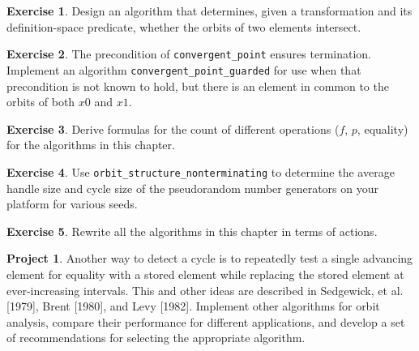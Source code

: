 \documentclass{report}
\theoremstyle{definition}
\newtheorem{exercise}{Exercise}[chapter]
\newtheorem{project}{Project}[chapter]
\theoremstyle{remark}
\begin{document}
\begin{exercise}
	Design an algorithm that determines, given a transformation and its
	definition-space predicate, whether the orbits of two elements
	intersect.
\end{exercise}

\begin{exercise}
	The precondition of \verb|convergent_point| ensures termination.
	Implement an algorithm \verb|convergent_point_guarded| for use when
	that precondition is not known to hold, but there is an element in
	common to the orbits of both $x0$ and $x1$.
\end{exercise}

\begin{exercise}
	Derive formulas for the count of different operations ($f$, $p$,
	equality) for the algorithms in this chapter.
\end{exercise}

\begin{exercise}
	Use \verb|orbit_structure_nonterminating| to determine the average
	handle size and cycle size of the pseudorandom number generators on
	your platform for various seeds.
\end{exercise}

\begin{exercise}
	Rewrite all the algorithms in this chapter in terms of actions.
\end{exercise}

\begin{project}
	Another way to detect a cycle is to repeatedly test a single
	advancing element for equality with a stored element while replacing
	the stored element at ever-increasing intervals. This and other ideas
	are described in Sedgewick, et al. [1979], Brent [1980], and Levy
	[1982]. Implement other algorithms for orbit analysis, compare their
	performance for different applications, and develop a set of
	recommendations for selecting the appropriate algorithm.
\end{project}
\end{document}
